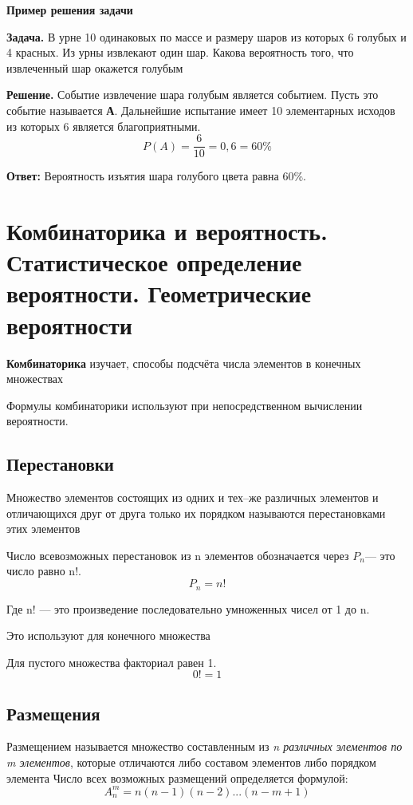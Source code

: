 \documentclass[a5paper]{article}
\begin{document}
	\vspace{\baselineskip}
	\begin{center}
		\textbf{Пример решения задачи}
	\end{center} 
	\par\textbf{Задача.} В урне 10 одинаковых по массе и размеру шаров из которых 6 голубых и 4 красных. Из урны извлекают один шар. Какова вероятность того, что извлеченный шар окажется голубым 
	
	\textbf{Решение.} Событие извлечение шара голубым является событием. Пусть это событие называется \textbf{А}. Дальнейшие испытание имеет 10 элементарных исходов из которых 6 является благоприятными. 
	\[ P(A) = \dfrac{6}{10} = 0,6 = 60\% \]
	\par \textbf{Ответ:} Вероятность изъятия шара голубого цвета равна 60\%. 
	
	\newpage
	\section{Комбинаторика и вероятность. Статистическое определение вероятности. Геометрические вероятности}
	
	\textbf{Комбинаторика} изучает, способы подсчёта числа элементов в конечных множествах
	
	Формулы комбинаторики используют при непосредственном вычислении вероятности.
	\subsection{Перестановки}
	Множество элементов состоящих из одних и  тех--же различных элементов и отличающихся друг от друга только их порядком называются перестановками этих элементов
	
	Число всевозможных перестановок из n элементов обозначается через $P_{n} $--- это число равно n!.
	\[ P_{n} = n!\]
	
	Где n! --- это произведение последовательно умноженных чисел от 1 до n. 
	
	Это используют для конечного множества
	
	Для пустого множества факториал равен 1.
	\[
		0! = 1
	\]
	
	\subsection{Размещения}
	Размещением называется множество составленным из\textit{ n различных элементов по m элементов}, которые отличаются либо составом элементов либо порядком элемента
	Число всех возможных размещений определяется формулой: 
	\[ A^{m}_{n}  = n(n-1)(n-2) ...(n-m+1)\] 
	
\end{document}
